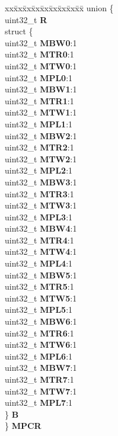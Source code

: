 \begin{DoxyCompactItemize}
\begin{tabbing}
\end{tabbing}\item 
\mbox{\label{structPBRIDGE__A__tag_ac408a28d0f9edc877bfdd47e7b8cea8b}} 
\begin{tabbing}
xx\=xx\=xx\=xx\=xx\=xx\=xx\=xx\=xx\=\kill
union \{\\
\>uint32\_t {\bfseries R}\\
\>struct \{\\
\>\>uint32\_t {\bfseries MBW0}:1\\
\>\>uint32\_t {\bfseries MTR0}:1\\
\>\>uint32\_t {\bfseries MTW0}:1\\
\>\>uint32\_t {\bfseries MPL0}:1\\
\>\>uint32\_t {\bfseries MBW1}:1\\
\>\>uint32\_t {\bfseries MTR1}:1\\
\>\>uint32\_t {\bfseries MTW1}:1\\
\>\>uint32\_t {\bfseries MPL1}:1\\
\>\>uint32\_t {\bfseries MBW2}:1\\
\>\>uint32\_t {\bfseries MTR2}:1\\
\>\>uint32\_t {\bfseries MTW2}:1\\
\>\>uint32\_t {\bfseries MPL2}:1\\
\>\>uint32\_t {\bfseries MBW3}:1\\
\>\>uint32\_t {\bfseries MTR3}:1\\
\>\>uint32\_t {\bfseries MTW3}:1\\
\>\>uint32\_t {\bfseries MPL3}:1\\
\>\>uint32\_t {\bfseries MBW4}:1\\
\>\>uint32\_t {\bfseries MTR4}:1\\
\>\>uint32\_t {\bfseries MTW4}:1\\
\>\>uint32\_t {\bfseries MPL4}:1\\
\>\>uint32\_t {\bfseries MBW5}:1\\
\>\>uint32\_t {\bfseries MTR5}:1\\
\>\>uint32\_t {\bfseries MTW5}:1\\
\>\>uint32\_t {\bfseries MPL5}:1\\
\>\>uint32\_t {\bfseries MBW6}:1\\
\>\>uint32\_t {\bfseries MTR6}:1\\
\>\>uint32\_t {\bfseries MTW6}:1\\
\>\>uint32\_t {\bfseries MPL6}:1\\
\>\>uint32\_t {\bfseries MBW7}:1\\
\>\>uint32\_t {\bfseries MTR7}:1\\
\>\>uint32\_t {\bfseries MTW7}:1\\
\>\>uint32\_t {\bfseries MPL7}:1\\
\>\} {\bfseries B}\\
\} {\bfseries MPCR}\\


\end{tabbing}
\end{DoxyCompactItemize}
